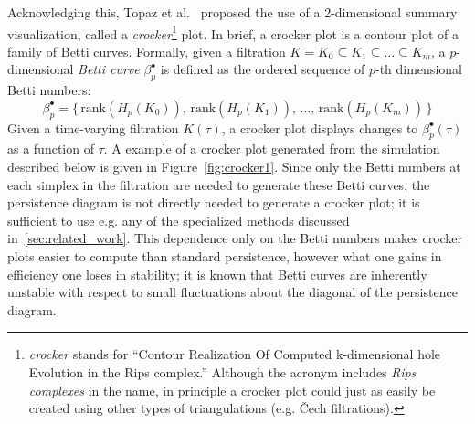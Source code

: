 \documentclass[sn-mathphys]{sn-jnl}
\begin{document}
Acknowledging this, Topaz et al.~\cite{topaz2015topological} proposed the use of a 2-dimensional summary visualization, called a \emph{crocker}\footnote{\emph{crocker} stands for ``Contour Realization Of Computed k-dimensional hole Evolution in the Rips complex.'' Although the acronym includes \emph{Rips complexes} in the name, in principle a crocker plot could just as easily be created using other types of triangulations (e.g. \v{C}ech filtrations).} plot. 
In brief, a crocker plot is a contour plot of a family of Betti curves. Formally, given a filtration $K = K_0 \subseteq K_1 \subseteq \dots \subseteq K_m$, a $p$-dimensional \emph{Betti curve} $\beta_p^{\bullet}$ is defined as the ordered sequence of $p$-th dimensional Betti numbers:
$$ \beta_p^\bullet = \{ \, \mathrm{rank}(H_p(K_0)), \, \mathrm{rank}(H_p(K_1)), \, \dots, \, \mathrm{rank}(H_p(K_m))\, \}$$
Given a time-varying filtration $K(\tau)$, a crocker plot displays changes to $\beta_p^\bullet(\tau)$ as a function of $\tau$. A example of a crocker plot generated from the simulation described below is given in Figure~\ref{fig:crocker1}. Since only the Betti numbers at each simplex in the filtration are needed to generate these Betti curves, the persistence diagram is not directly needed to generate a crocker plot; it is sufficient to use e.g. any of the specialized methods discussed in~\ref{sec:related_work}. This dependence only on the Betti numbers makes crocker plots easier to compute than standard persistence, however what one gains in efficiency one loses in stability; it is known that Betti curves are inherently unstable with respect to small fluctuations about the diagonal of the persistence diagram. 
\end{document}
